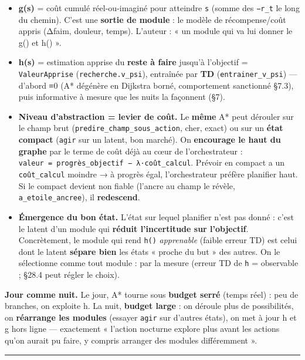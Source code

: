 \documentclass[
  french,
  11pt,
]{article}
\providecommand{\tightlist}{%
  \setlength{\itemsep}{0pt}\setlength{\parskip}{0pt}}
\begin{document}
\begin{itemize}
\tightlist
\item
  \textbf{g(s)} = coût cumulé réel-ou-imaginé pour atteindre \texttt{s}
  (somme des \texttt{−r\_t} le long du chemin). C'est une \textbf{sortie
  de module} : le modèle de récompense/coût appris (Δfaim, douleur,
  temps). L'auteur : « un module qui va lui donner le g() et h() ».
\item
  \textbf{h(s)} = estimation apprise du \textbf{reste à faire} jusqu'à
  l'objectif = \texttt{ValeurApprise} (\texttt{recherche.v\_psi}),
  entraînée par \textbf{TD} (\texttt{entrainer\_v\_psi}) --- d'abord ≡0
  (A* dégénère en Dijkstra borné, comportement sanctionné §7.3), puis
  informative à mesure que les nuits la façonnent (§7).
\item
  \textbf{Niveau d'abstraction = levier de coût.} Le \textbf{même} A*
  peut dérouler sur le champ brut
  (\texttt{predire\_champ\_sous\_action}, cher, exact) ou sur un
  \textbf{état compact} (\texttt{agir} sur un latent, bon marché). On
  \textbf{encourage le haut du graphe} par le terme de coût déjà au cœur
  de l'orchestrateur :
  \texttt{valeur\ =\ progrès\_objectif\ −\ λ·coût\_calcul}. Prévoir en
  compact a un \texttt{coût\_calcul} moindre → à progrès égal,
  l'orchestrateur préfère planifier haut. Si le compact devient non
  fiable (l'ancre au champ le révèle, \texttt{a\_etoile\_ancree}), il
  \textbf{redescend}.
\item
  \textbf{Émergence du bon état.} L'état sur lequel planifier n'est pas
  donné : c'est le latent d'un module qui \textbf{réduit l'incertitude
  sur l'objectif}. Concrètement, le module qui rend \texttt{h()}
  \emph{apprenable} (faible erreur TD) est celui dont le latent
  \textbf{sépare bien} les états « proche du but » des autres. On le
  sélectionne comme tout module : par la mesure (erreur TD de \texttt{h}
  = observable ; §28.4 peut régler le choix).
\end{itemize}

\textbf{Jour comme nuit.} Le jour, A* tourne sous \textbf{budget serré}
(temps réel) : peu de branches, on exploite h. La nuit, \textbf{budget
large} : on déroule plus de possibilités, on \textbf{réarrange les
modules} (essayer \texttt{agir} sur d'autres états), on met à jour h et
g hors ligne --- exactement « l'action nocturne explore plus avant les
actions qu'on aurait pu faire, y compris arranger des modules
différemment ».

\begin{center}\rule{0.5\linewidth}{0.5pt}\end{center}
\end{document}
